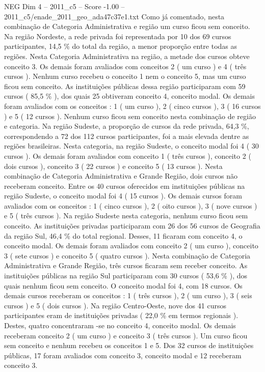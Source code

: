 \begin{textsample}{NEG Dim 4 – 2011\_c5 – Score -1.00 – 2011\_c5/enade\_2011\_geo\_ada47c37e1.txt}
Como já comentado, nesta combinação de Categoria Administrativa e região um curso ficou sem conceito.
Na região Nordeste, a rede privada foi representada por 10 dos 69 cursos participantes, 14,5 \% do total da região, a menor proporção entre todas as regiões.
Nesta Categoria Administrativa na região, a metade dos cursos obteve conceito 3.
Os demais foram avaliados com conceitos 2 ( um curso ) e 4 ( três cursos ).
Nenhum curso recebeu o conceito 1 nem o conceito 5, mas um curso ficou sem conceito.
As instituições públicas dessa região participaram com 59 cursos ( 85,5 \% ), dos quais 25 obtiveram conceito 4, conceito modal.
Os demais foram avaliados com os conceitos : 1 ( um curso ), 2 ( cinco cursos ), 3 ( 16 cursos ) e 5 ( 12 cursos ).
Nenhum curso ficou sem conceito nesta combinação de região e categoria.
Na região Sudeste, a proporção de cursos da rede privada, 64,3 \%, correspondendo a 72 dos 112 cursos participantes, foi a mais elevada dentre as regiões brasileiras.
Nesta categoria, na região Sudeste, o conceito modal foi 4 ( 30 cursos ).
Os demais foram avaliados com conceito 1 ( três cursos ), conceito 2 ( dois cursos ), conceito 3 ( 22 cursos ) e conceito 5 ( 13 cursos ).
Nesta combinação de Categoria Administrativa e Grande Região, dois cursos não receberam conceito.
Entre os 40 cursos oferecidos em instituições públicas na região Sudeste, o conceito modal foi 4 ( 15 cursos ).
Os demais cursos foram avaliados com os conceitos : 1 ( cinco cursos ), 2 ( oito cursos ), 3 ( nove cursos ) e 5 ( três cursos ).
Na região Sudeste nesta categoria, nenhum curso ficou sem conceito.
As instituições privadas participaram com 26 dos 56 cursos de Geografia da região Sul, 46,4 \% do total regional.
Desses, 11 ficaram com conceito 4, o conceito modal.
Os demais foram avaliados com conceito 2 ( um curso ), conceito 3 ( sete cursos ) e conceito 5 ( quatro cursos ).
Nesta combinação de Categoria Administrativa e Grande Região, três cursos ficaram sem receber conceito.
As instituições públicas na região Sul participaram com 30 cursos ( 53,6 \% ), dos quais nenhum ficou sem conceito.
O conceito modal foi 4, com 18 cursos.
Os demais cursos receberam os conceitos : 1 ( três cursos ), 2 ( um curso ), 3 ( seis cursos ) e 5 ( dois cursos ).
Na região Centro-Oeste, nove dos 41 cursos participantes eram de instituições privadas ( 22,0 \% em termos regionais ).
Destes, quatro concentraram -se no conceito 4, conceito modal.
Os demais receberam conceito 2 ( um curso ) e conceito 3 ( três cursos ).
Um curso ficou sem conceito e nenhum recebeu os conceitos 1 e 5.
Dos 32 cursos de instituições públicas, 17 foram avaliados com conceito 3, conceito modal e 12 receberam conceito 3.

\end{textsample}
